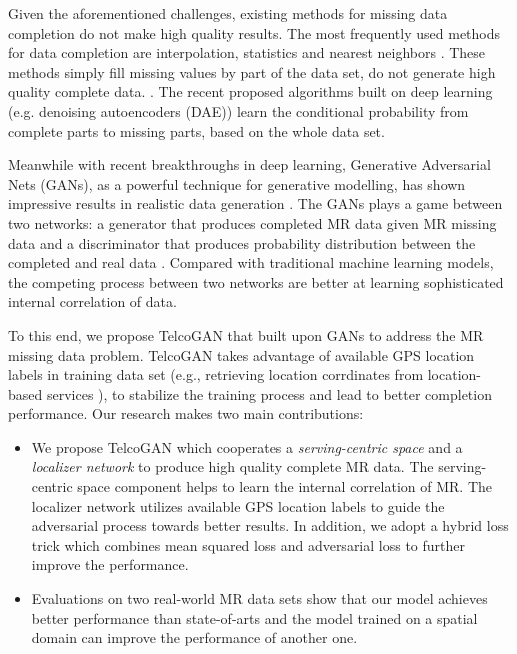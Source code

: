 Given the aforementioned challenges, existing methods for missing data completion do not make high quality results. The most frequently used methods for data completion are interpolation, statistics and nearest neighbors \cite{DBLP:journals/bioinformatics/TroyanskayaCSBHTBA01}. These methods simply fill missing values by part of the data set, do not generate high quality complete data. . The recent proposed algorithms built on deep learning (e.g. denoising autoencoders (DAE)) \cite{DBLP:conf/pakdd/GondaraW18} learn the conditional probability from complete parts to missing parts, based on the whole data set.


Meanwhile with recent breakthroughs in deep learning, Generative Adversarial Nets (GANs), as a powerful technique for generative modelling, has shown impressive results in realistic data generation \cite{DBLP:conf/nips/GoodfellowPMXWOCB14,DBLP:conf/cvpr/LedigTHCCAATTWS17}. The GANs plays a game between two networks: a generator that produces completed MR data given MR missing data and a discriminator that produces probability distribution between the completed and real data \cite{DBLP:conf/nips/GoodfellowPMXWOCB14}. Compared with traditional machine learning models, the competing process between two networks are better at learning sophisticated internal correlation of data.

To this end, we propose TelcoGAN that built upon GANs to address the MR missing data problem. TelcoGAN takes advantage of available GPS location labels in training data set (e.g., retrieving location corrdinates from location-based services \cite{DBLP:journals/imwut/HuangLWCXZ17}), to stabilize the training process and lead to better completion performance. Our research makes two main contributions:

\begin{itemize}
  \item We propose TelcoGAN which cooperates a \emph{serving-centric space} and a \emph{localizer network} to produce high quality complete MR data. The serving-centric space component helps to learn the internal correlation of MR. The localizer network utilizes available GPS location labels to guide the adversarial process towards better results. In addition, we adopt a hybrid loss trick which combines mean squared loss and adversarial loss to further improve the performance.
  \item Evaluations on two real-world MR data sets show that our model achieves better performance than state-of-arts and the model trained on a spatial domain can improve the performance of another one.
\end{itemize}

